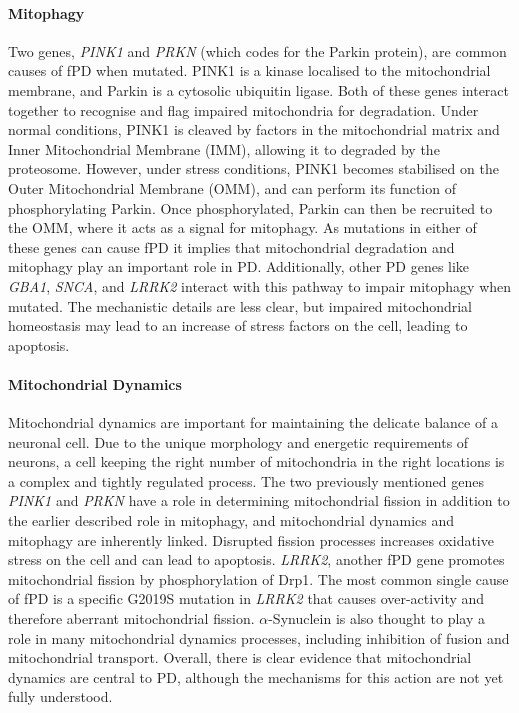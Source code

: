 \documentclass{article}
\begin{document}
\paragraph{Mitophagy}Two genes, \textit{PINK1} and \textit{PRKN} (which codes for the Parkin protein), are common causes of fPD when mutated\cite{Malpartida2021MitochondrialTherapy}. PINK1 is a kinase localised to the mitochondrial membrane\cite{Narendra2010PINK1Parkin}, and Parkin is a cytosolic ubiquitin ligase\cite{Narendra2008ParkinAutophagy}. Both of these genes interact together to recognise and flag impaired mitochondria for degradation. Under normal conditions, PINK1 is cleaved by factors in the mitochondrial matrix and Inner Mitochondrial Membrane (IMM), allowing it to degraded by the proteosome\cite{Pickles2018MitophagyMaintenance}. However, under stress conditions, PINK1 becomes stabilised on the Outer Mitochondrial Membrane (OMM), and can perform its function of phosphorylating Parkin. Once phosphorylated, Parkin can then be recruited to the OMM, where it acts as a signal for mitophagy. As mutations in either of these genes can cause fPD it implies that mitochondrial degradation and mitophagy play an important role in PD. Additionally, other PD genes like \textit{GBA1}, \textit{SNCA}, and \textit{LRRK2} interact with this pathway to impair mitophagy when mutated\cite{Malpartida2021MitochondrialTherapy}. The mechanistic details are less clear, but impaired mitochondrial homeostasis may lead to an increase of stress factors on the cell, leading to apoptosis\cite{Eldeeb2022MitochondrialDisease}.
\paragraph{Mitochondrial Dynamics}Mitochondrial dynamics are important for maintaining the delicate balance of a neuronal cell\cite{Chen2009MitochondrialDiseases}. Due to the unique morphology and energetic requirements of neurons, a cell keeping the right number of mitochondria in the right locations is a complex and tightly regulated process. The two previously mentioned genes \textit{PINK1} and \textit{PRKN} have a role in determining mitochondrial fission in addition to the earlier described role in mitophagy, and mitochondrial dynamics and mitophagy are inherently linked\cite{Archer2013MitochondrialDiseases}. Disrupted fission processes increases oxidative stress on the cell and can lead to apoptosis. \textit{LRRK2}, another fPD gene promotes mitochondrial fission by phosphorylation of Drp1. The most common single cause of fPD is a specific G2019S mutation in \textit{LRRK2} that causes over-activity and therefore aberrant mitochondrial fission\cite{Su2013InhibitionMutation}. $\alpha$-Synuclein is also thought to play a role in many mitochondrial dynamics processes, including inhibition of fusion and mitochondrial transport\cite{Valdinocci2019IntracellularDisease}. Overall, there is clear evidence that mitochondrial dynamics are central to PD, although the mechanisms for this action are not yet fully understood.
\end{document}
